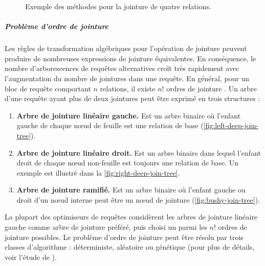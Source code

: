 \begin{figure}
  \centering
  \quad
  \quad
  \caption{Exemple des méthodes pour la jointure de quatre relations.}\label{fig:join-tree-examples}
\end{figure}

\subparagraph{Problème d'ordre de jointure} %
Les règles de transformation algébriques pour l'opération de jointure peuvent produire de nombreuses expressions de jointure équivalentes. En conséquence, le nombre d'arborescences de requêtes alternatives croît très rapidement avec l'augmentation du nombre de jointures dans une requête. En général, pour un bloc de requête comportant $n$ relations, il existe $n!$ ordres de jointure \cite{Elmasri08}.
Un arbre d'une requête ayant plus de deux jointures peut être exprimé en trois structures : 
\begin{enumerate}
 \item \textbf{Arbre de jointure linéaire gauche.} Est un arbre binaire où l'enfant gauche de chaque nœud de feuille est une relation de base (\ref{fig:left-deep-join-tree}).
 \item \textbf{Arbre de jointure linéaire droit.} Est un arbre binaire dans lequel l'enfant droit de chaque nœud non-feuille est toujours une relation de base. Un exemple est illustré dans la \ref{fig:right-deep-join-tree}.
 \item \textbf{Arbre de jointure ramifié.} Est un arbre binaire où l'enfant gauche ou droit d'un nœud interne peut être un nœud de jointure (\ref{fig:bushy-join-tree}). 
\end{enumerate}

La plupart des optimiseurs de requêtes considèrent les arbres de jointure linéaire gauche comme arbre de jointure préféré, puis choisi un parmi les $n!$ ordres de jointure possibles. Le problème d'ordre de jointure peut être résolu par trois classes d'algorithme : déterministe, aléatoire ou génétique (pour plus de détails, voir l'étude de \cite{Vellev09}).

